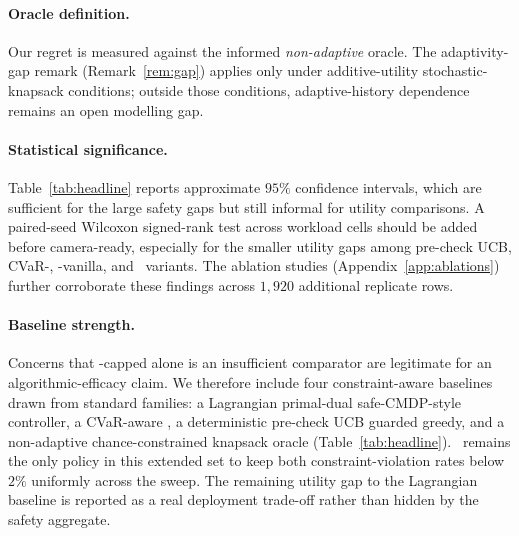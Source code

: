 \paragraph{Oracle definition.}
Our regret is measured against the informed \emph{non-adaptive}
oracle. The adaptivity-gap remark (Remark~\ref{rem:gap}) applies only
under additive-utility stochastic-knapsack conditions; outside those
conditions, adaptive-history dependence remains an open modelling gap.

\paragraph{Statistical significance.}
Table~\ref{tab:headline} reports approximate $95\%$ confidence
intervals, which are sufficient for the large safety gaps but still
informal for utility comparisons. A paired-seed Wilcoxon signed-rank
test across workload cells should be added before camera-ready,
especially for the smaller utility gaps among pre-check UCB,
CVaR-\BwK, \BwK-vanilla, and \CBUC~variants. The ablation studies
(Appendix~\ref{app:ablations}) further corroborate these findings
across $1{,}920$ additional replicate rows.

\paragraph{Baseline strength.}
Concerns that \ReAct-capped alone is an insufficient comparator are
legitimate for an algorithmic-efficacy claim. We therefore include
four constraint-aware baselines drawn from standard families: a
Lagrangian primal-dual safe-CMDP-style controller, a CVaR-aware \BwK,
a deterministic pre-check UCB guarded greedy, and a non-adaptive
chance-constrained knapsack oracle
(Table~\ref{tab:headline}). \CBUC~remains the only policy in this
extended set to keep both constraint-violation rates below $2\%$
uniformly across the sweep. The remaining utility gap to the
Lagrangian baseline is reported as a real deployment trade-off rather
than hidden by the safety aggregate.
